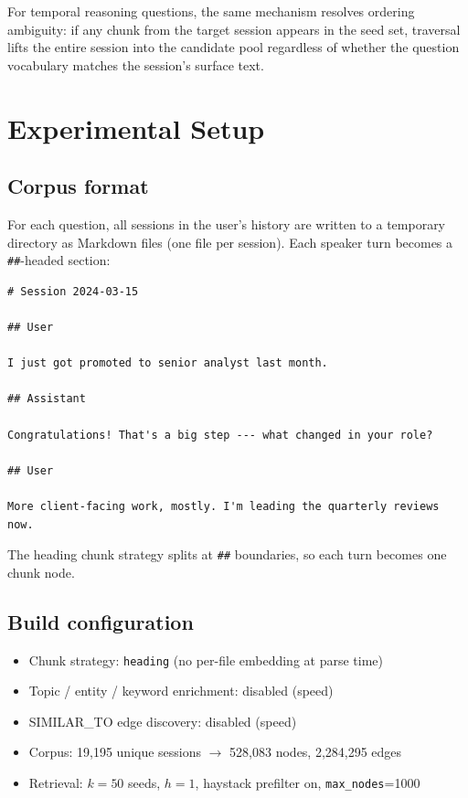 \documentclass[11pt,a4paper]{article}
\begin{document}
For temporal reasoning questions, the same mechanism resolves ordering ambiguity:
if any chunk from the target session appears in the seed set, traversal lifts the
entire session into the candidate pool regardless of whether the question vocabulary
matches the session's surface text.

\section{Experimental Setup}
\label{sec:setup}

\subsection{Corpus format}

For each question, all sessions in the user's history are written to a temporary
directory as Markdown files (one file per session).
Each speaker turn becomes a \texttt{\#\#}-headed section:

\begin{lstlisting}
# Session 2024-03-15

## User

I just got promoted to senior analyst last month.

## Assistant

Congratulations! That's a big step --- what changed in your role?

## User

More client-facing work, mostly. I'm leading the quarterly reviews now.
\end{lstlisting}

The heading chunk strategy splits at \texttt{\#\#} boundaries, so each turn
becomes one chunk node.

\subsection{Build configuration}

\begin{itemize}
  \item Chunk strategy: \texttt{heading} (no per-file embedding at parse time)
  \item Topic / entity / keyword enrichment: disabled (speed)
  \item SIMILAR\_TO edge discovery: disabled (speed)
  \item Corpus: 19,195 unique sessions $\rightarrow$ 528,083 nodes, 2,284,295 edges
  \item Retrieval: $k{=}50$ seeds, $h{=}1$, haystack prefilter on, \texttt{max\_nodes}=1000
\end{itemize}
\end{document}
